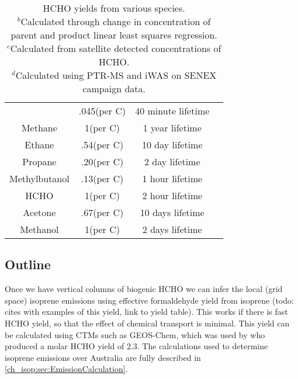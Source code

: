 \begin{table}
\begin{tabular}{ | c | c | c | c |  }
                            & .045(per C)      & 40 minute lifetime & \citep{Palmer2003}               \\
       Methane          & 1(per C)      & 1 year lifetime   & \citep{Palmer2003}     \\ 
       Ethane            & .54(per C)   & 10 day lifetime   & \citep{Palmer2003}     \\ 
       Propane           & .20(per C)   & 2 day lifetime    & \citep{Palmer2003}     \\ 
       Methylbutanol    & .13(per C)    & 1 hour lifetime  &  \citep{Palmer2003}     \\ 
       HCHO             & 1(per C)      & 2 hour lifetime   &   \citep{Palmer2003}     \\ 
       Acetone          & .67(per C)    & 10 days lifetime  &  \citep{Palmer2003}     \\ 
       Methanol         & 1(per C)      & 2 days lifetime   &  \citep{Palmer2003}     \\ 
       \hline             
    \end{tabular}
    \caption{%
      HCHO yields from various species. \hspace{\textwidth} \\ 
      ${}^b$Calculated through change in concentration of parent and product linear least squares regression. \hspace{\textwidth} \\
      ${}^c$Calculated from satellite detected concentrations of HCHO. \hspace{\textwidth} \\
      ${}^d$Calculated using PTR-MS and iWAS on SENEX campaign data.
    }
    \label{ch_HCHO:tab:VOCLiteratureYields}
    \end{table}

  \subsection{Outline}
    Once we have vertical columns of biogenic HCHO we can infer the local (grid space) isoprene emissions using effective formaldehyde yield from isoprene (todo: cites with examples of this yield, link to yield table).
    This works if there is fast HCHO yield, so that the effect of chemical transport is minimal.
    This yield can be calculated using CTMs such as GEOS-Chem, which was used by \citet{Millet2006} who produced a molar HCHO yield of 2.3.
    The calculations used to determine isoprene emissions over Australia are fully described in \ref{ch_isop:sec:EmissionCalculation}.
    
